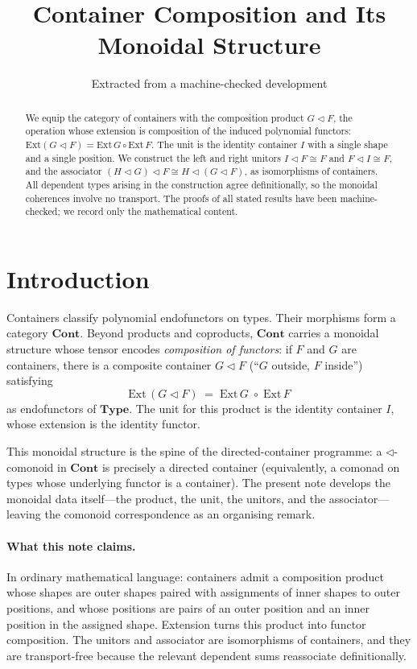 \documentclass[11pt,a4paper]{article}
\title{Container Composition and Its\\
  Monoidal Structure}
\author{Extracted from a machine-checked development}
\date{}
\theoremstyle{plain}
\theoremstyle{definition}
\newcommand{\Ext}{\mathrm{Ext}}
\newcommand{\Type}{\mathbf{Type}}
\newcommand{\Cont}{\mathbf{Cont}}
\newcommand{\compop}{\mathbin{\triangleleft}}
\begin{document}
\maketitle

\begin{abstract}
We equip the category of containers with the composition product
$G\compop F$, the operation whose extension is composition of the induced
polynomial functors: $\Ext(G\compop F)=\Ext\,G\circ\Ext\,F$. The unit is the
identity container $I$ with a single shape and a single position. We construct
the left and right unitors $I\compop F\cong F$ and $F\compop I\cong F$, and
the associator $(H\compop G)\compop F\cong H\compop(G\compop F)$, as
isomorphisms of containers. All dependent types arising in the construction
agree definitionally, so the monoidal coherences involve no transport. The
proofs of all stated results have been machine-checked; we record only the
mathematical content.
\end{abstract}

\tableofcontents
\bigskip

\section{Introduction}

Containers classify polynomial endofunctors on types. Their morphisms form a
category $\Cont$. Beyond products and coproducts, $\Cont$ carries a monoidal
structure whose tensor encodes \emph{composition of functors}: if $F$ and $G$
are containers, there is a composite container $G\compop F$ (``$G$ outside,
$F$ inside'') satisfying
\[
  \Ext\,(G\compop F) \;=\; \Ext\,G \;\circ\; \Ext\,F
\]
as endofunctors of $\Type$. The unit for this product is the identity
container $I$, whose extension is the identity functor.

This monoidal structure is the spine of the directed-container programme: a
$\compop$-comonoid in $\Cont$ is precisely a directed container (equivalently,
a comonad on types whose underlying functor is a container). The present note
develops the monoidal data itself---the product, the unit, the unitors, and
the associator---leaving the comonoid correspondence as an organising remark.

\paragraph{What this note claims.}
In ordinary mathematical language: containers admit a composition product
whose shapes are outer shapes paired with assignments of inner shapes to outer
positions, and whose positions are pairs of an outer position and an inner
position in the assigned shape. Extension turns this product into functor
composition. The unitors and associator are isomorphisms of containers, and
they are transport-free because the relevant dependent sums reassociate
definitionally.
\end{document}
